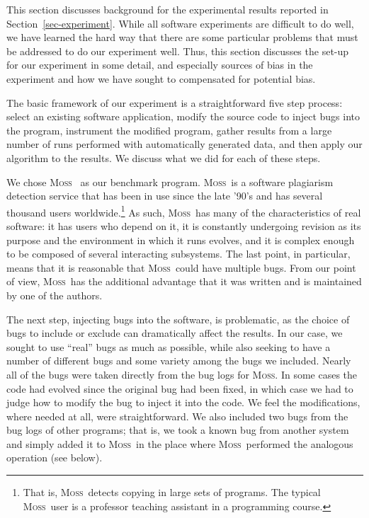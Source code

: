 \newcommand{\moss}{\textsc{Moss}}

This section discusses background for the experimental results
reported in Section~\ref{sec-experiment}.  While all software
experiments are difficult to do well, we have learned the hard way
that there are some particular problems that must be addressed to do
our experiment well.  Thus, this section discusses the set-up for our
experiment in some detail, and especially sources of bias in the
experiment and how we have sought to compensated for potential bias.

The basic framework of our experiment is a straightforward five step
process: select an existing software application, modify the source
code to inject bugs into the program, instrument the modified program,
gather results from a large number of runs performed with
automatically generated data, and then apply our algorithm to the
results.  We discuss what we did for each of these steps.

We chose \moss\ \cite{SWA03} as our benchmark program.  \moss\ is a
software plagiarism detection service that has been in use since the
late '90's and has several thousand users worldwide.\footnote{That is,
\moss\ detects copying in large sets of programs.  The typical \moss\
user is a professor teaching assistant in a programming course.}  As
such, \moss\ has many of the characteristics of real software: it has
users who depend on it, it is constantly undergoing revision as its
purpose and the environment in which it runs evolves, and it is
complex enough to be composed of several interacting subsystems.  The
last point, in particular, means that it is reasonable that \moss\
could have multiple bugs.  From our point of view, \moss\ has the
additional advantage that it was written and is maintained by one of
the authors.

The next step, injecting bugs into the software, is problematic, as
the choice of bugs to include or exclude can dramatically affect the
results.  In our case, we sought to use ``real'' bugs as much as
possible, while also seeking to have a number of different bugs and
some variety among the bugs we included.  Nearly all of the bugs were
taken directly from the bug logs for \moss.  In some cases the code
had evolved since the original bug had been fixed, in which case we
had to judge how to modify the bug to inject it into the code.  We
feel the modifications, where needed at all, were straightforward.  We
also included two bugs from the bug logs of other programs; that is,
we took a known bug from another system and simply added it to \moss\
in the place where \moss\ performed the analogous operation (see
below).

